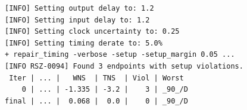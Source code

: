 \documentclass[10pt,a4paper,twocolumn]{article}
\begin{document}
\begin{lstlisting}[caption={LibreLane timing repair before routing, 6.0\,ns run: timing is closed to +0.068\,ns; the final slack after routing is $-0.154$\,ns.},captionpos=b,label={lst:rsz}]
[INFO] Setting output delay to: 1.2
[INFO] Setting input delay to: 1.2
[INFO] Setting clock uncertainty to: 0.25
[INFO] Setting timing derate to: 5.0%
+ repair_timing -verbose -setup -setup_margin 0.05 ...
[INFO RSZ-0094] Found 3 endpoints with setup violations.
 Iter | ... |   WNS  | TNS  | Viol | Worst
    0 | ... | -1.335 | -3.2 |    3 | _90_/D
final | ... |  0.068 |  0.0 |    0 | _90_/D
\end{lstlisting}


\end{document}
